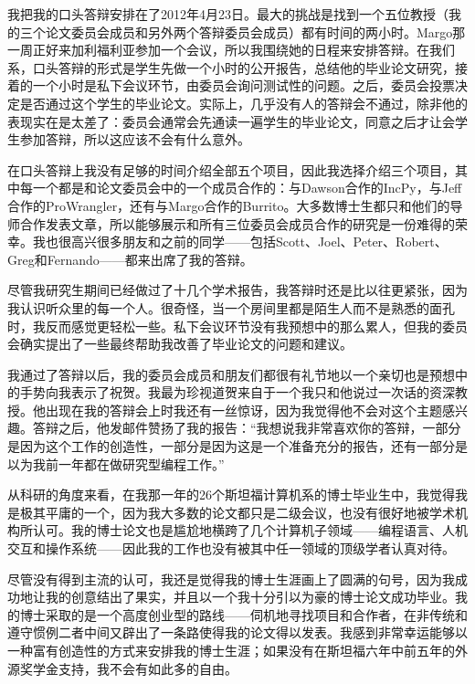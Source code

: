 \documentclass[letter,12pt]{book}
\begin{document}
\begin{CJK}{UTF8}{gbsn}
\breakline

我把我的口头答辩安排在了2012年4月23日。最大的挑战是找到一个五位教授（我的三个论文委员会成员和另外两个答辩委员会成员）都有时间的两小时。Margo那一周正好来加利福利亚参加一个会议，所以我围绕她的日程来安排答辩。在我们系，口头答辩的形式是学生先做一个小时的公开报告，总结他的毕业论文研究，接着的一个小时是私下会议环节，由委员会询问测试性的问题。之后，委员会投票决定是否通过这个学生的毕业论文。实际上，几乎没有人的答辩会不通过，除非他的表现实在是太差了：委员会通常会先通读一遍学生的毕业论文，同意之后才让会学生参加答辩，所以这应该不会有什么意外。

在口头答辩上我没有足够的时间介绍全部五个项目，因此我选择介绍三个项目，其中每一个都是和论文委员会中的一个成员合作的：与Dawson合作的IncPy，与Jeff合作的ProWrangler，还有与Margo合作的Burrito。大多数博士生都只和他们的导师合作发表文章，所以能够展示和所有三位委员会成员合作的研究是一份难得的荣幸。我也很高兴很多朋友和之前的同学——包括Scott、Joel、Peter、Robert、Greg和Fernando——都来出席了我的答辩。

尽管我研究生期间已经做过了十几个学术报告，我答辩时还是比以往更紧张，因为我认识听众里的每一个人。很奇怪，当一个房间里都是陌生人而不是熟悉的面孔时，我反而感觉更轻松一些。私下会议环节没有我预想中的那么累人，但我的委员会确实提出了一些最终帮助我改善了毕业论文的问题和建议。

我通过了答辩以后，我的委员会成员和朋友们都很有礼节地以一个亲切也是预想中的手势向我表示了祝贺。我最为珍视道贺来自于一个我只和他说过一次话的资深教授。他出现在我的答辩会上时我还有一丝惊讶，因为我觉得他不会对这个主题感兴趣。答辩之后，他发邮件赞扬了我的报告：“我想说我非常喜欢你的答辩，一部分是因为这个工作的创造性，一部分是因为这是一个准备充分的报告，还有一部分是以为我前一年都在做研究型编程工作。”

\breakline

从科研的角度来看，在我那一年的26个斯坦福计算机系的博士毕业生中，我觉得我是极其平庸的一个，因为我大多数的论文都只是二级会议，也没有很好地被学术机构所认可。我的博士论文也是尴尬地横跨了几个计算机子领域——编程语言、人机交互和操作系统——因此我的工作也没有被其中任一领域的顶级学者认真对待。

尽管没有得到主流的认可，我还是觉得我的博士生涯画上了圆满的句号，因为我成功地让我的创意结出了果实，并且以一个我十分引以为豪的博士论文成功毕业。我的博士采取的是一个高度创业型的路线——伺机地寻找项目和合作者，在非传统和遵守惯例二者中间又辟出了一条路使得我的论文得以发表。我感到非常幸运能够以一种富有创造性的方式来安排我的博士生涯；如果没有在斯坦福六年中前五年的外源奖学金支持，我不会有如此多的自由。


\end{CJK}
\end{document}
